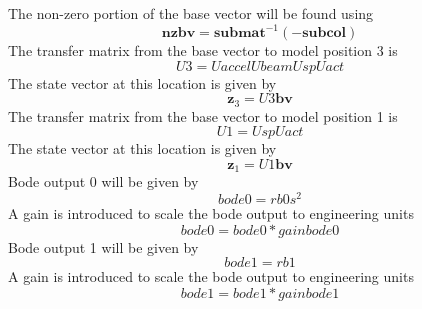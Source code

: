 \documentclass[12pt]{article}
\newcommand{\M}[1]{\mathbf{#1}}
\begin{document}
The non-zero portion of the base vector will be found using
\begin{equation}
\M{nzbv}=\M{submat}^{-1}\left(-\M{subcol}\right)
\end{equation}
The transfer matrix from the base vector to model position 3 is
\begin{equation}
	U3=Uaccel Ubeam Usp Uact
\end{equation}
The state vector at this location is given by
\begin{equation}
	\M{z}_{3}=U3 \M{bv}
\end{equation}
The transfer matrix from the base vector to model position 1 is
\begin{equation}
	U1=Usp Uact
\end{equation}
The state vector at this location is given by
\begin{equation}
	\M{z}_{1}=U1 \M{bv}
\end{equation}
Bode output 0 will be given by
\begin{equation}
	bode0=rb0 s^2
\end{equation}
A gain is introduced to scale the bode output to engineering units
\begin{equation}
	bode0=bode0*gainbode0
\end{equation}
Bode output 1 will be given by
\begin{equation}
	bode1=rb1
\end{equation}
A gain is introduced to scale the bode output to engineering units
\begin{equation}
	bode1=bode1*gainbode1
\end{equation}
\end{document}
